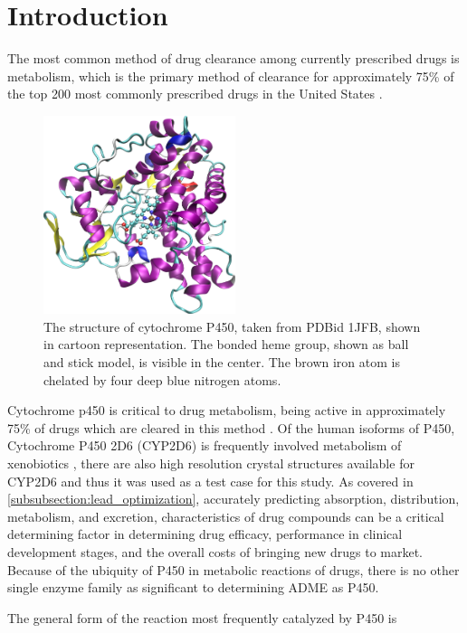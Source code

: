 \section{Introduction}
\label{section:p450/introduction}
The most common method of drug clearance among currently prescribed drugs is metabolism, which is the primary method of clearance for approximately 75\% of the top 200 most commonly prescribed drugs in the United States \cite{williams2004drug}.
\begin{figure}[h]
\centering
\includegraphics[width=0.5\textwidth]{figures/p450.png}
\caption{
The structure of cytochrome P450, taken from PDBid 1JFB, shown in cartoon representation.
The bonded heme group, shown as ball and stick model, is visible in the center.
The brown iron atom is chelated by four deep blue nitrogen atoms. 
}
\label{fig:p450}
\end{figure}
Cytochrome p450 is critical to drug metabolism, being active in approximately 75\% of drugs which are cleared in this method \cite{guengerich2007cytochrome}.
Of the human isoforms of P450, Cytochrome P450 2D6 (CYP2D6) is frequently involved metabolism of xenobiotics \cite{williams2004drug}, there are also high resolution crystal structures available for CYP2D6 \cite{rowland2006crystal} and thus it was used as a test case for this study.
As covered in \ref{subsubsection:lead_optimization}, accurately predicting  absorption, distribution, metabolism, and excretion, characteristics of drug compounds can be a critical determining factor in determining drug efficacy, performance in clinical development stages, and the overall costs of bringing new drugs to market.
Because of the ubiquity of P450 in metabolic reactions of drugs, there is no other single enzyme family as significant to determining ADME as P450.   

The general form of the reaction most frequently catalyzed by P450 is 


